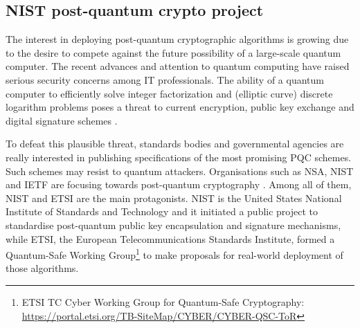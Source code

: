 \documentclass[a4paper,12pt]{article}
\begin{document}
\subsection{NIST post-quantum crypto project}
\label{sub:NIST}

The interest in deploying post-quantum cryptographic algorithms is growing due to the desire to compete against the future possibility of a large-scale quantum computer. 
The recent advances and attention to quantum computing have raised serious security concerns among IT professionals. The ability of a quantum computer to efficiently solve integer factorization and (elliptic curve) discrete logarithm problems poses a threat to current encryption, public key exchange and digital signature schemes \cite{5_postquantum_signature_usecase}.

To defeat this plausible threat, standards bodies and governmental agencies are really interested in publishing specifications of the most promising PQC schemes. Such schemes may resist to quantum attackers. Organisations such as NSA, NIST and IETF are focusing towards post-quantum cryptography \cite{9_postquantum_auth_openssl}.
Among all of them, NIST and ETSI are the main protagonists. NIST is the United States National Institute of Standards and Technology and it initiated a public project to standardise post-quantum public key encapsulation and signature mechanisms, while ETSI, the European Telecommunications Standards Institute, formed a Quantum-Safe Working Group\footnote{ETSI TC Cyber Working Group for Quantum-Safe Cryptography: \url{https://portal.etsi.org/TB-SiteMap/CYBER/CYBER-QSC-ToR}} to make proposals for real-world deployment of those algorithms.
\end{document}
